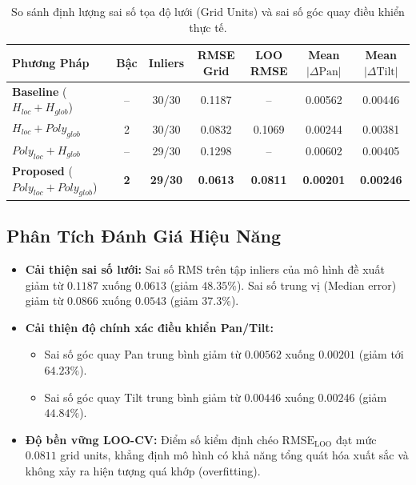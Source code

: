 \documentclass[11pt,a4paper]{article}
\begin{document}
\begin{table}[htbp]
\centering
\small
\renewcommand{\arraystretch}{1.3}
\begin{tabularx}{\textwidth}{l c c c c c c}
\toprule
\textbf{Phương Pháp} & \textbf{Bậc} & \textbf{Inliers} & \textbf{RMSE Grid} & \textbf{LOO RMSE} & \textbf{Mean $|\Delta\text{Pan}|$} & \textbf{Mean $|\Delta\text{Tilt}|$} \\
\midrule
\textbf{Baseline} ($H_{loc} + H_{glob}$) & -- & 30/30 & 0.1187 & -- & 0.00562 & 0.00446 \\
$H_{loc} + Poly_{glob}$ & 2 & 30/30 & 0.0832 & 0.1069 & 0.00244 & 0.00381 \\
$Poly_{loc} + H_{glob}$ & -- & 29/30 & 0.1298 & -- & 0.00602 & 0.00405 \\
\textbf{Proposed} ($Poly_{loc} + Poly_{glob}$) & \textbf{2} & \textbf{29/30} & \textbf{0.0613} & \textbf{0.0811} & \textbf{0.00201} & \textbf{0.00246} \\
\bottomrule
\end{tabularx}
\caption{So sánh định lượng sai số tọa độ lưới (Grid Units) và sai số góc quay điều khiển thực tế.}
\label{tab:quantitative_comparison}
\end{table}

\subsection{Phân Tích Đánh Giá Hiệu Năng}
\begin{itemize}[leftmargin=1.5cm]
    \item \textbf{Cải thiện sai số lưới:} Sai số RMS trên tập inliers của mô hình đề xuất giảm từ $0.1187$ xuống $0.0613$ (giảm \textbf{$48.35\%$}). Sai số trung vị (Median error) giảm từ $0.0866$ xuống $0.0543$ (giảm \textbf{$37.3\%$}).
    \item \textbf{Cải thiện độ chính xác điều khiển Pan/Tilt:}
    \begin{itemize}
        \item Sai số góc quay Pan trung bình giảm từ $0.00562$ xuống $0.00201$ (giảm tới \textbf{$64.23\%$}).
        \item Sai số góc quay Tilt trung bình giảm từ $0.00446$ xuống $0.00246$ (giảm \textbf{$44.84\%$}).
    \end{itemize}
    \item \textbf{Độ bền vững LOO-CV:} Điểm số kiểm định chéo $\text{RMSE}_{\text{LOO}}$ đạt mức $0.0811$ grid units, khẳng định mô hình có khả năng tổng quát hóa xuất sắc và không xảy ra hiện tượng quá khớp (overfitting).
\end{itemize}
\end{document}
